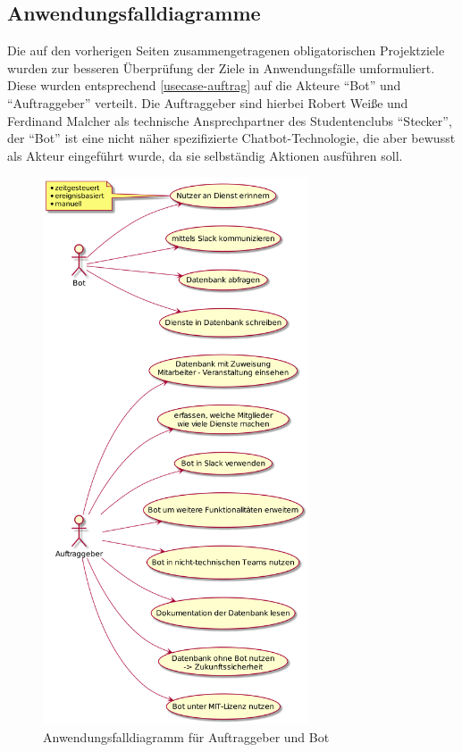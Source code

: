 \subsection{Anwendungsfalldiagramme}


Die auf den vorherigen Seiten zusammengetragenen obligatorischen Projektziele wurden zur besseren Überprüfung der Ziele in Anwendungsfälle umformuliert. Diese wurden entsprechend \autoref{usecase-auftrag} auf die Akteure \enquote{Bot} und \enquote{Auftraggeber} verteilt.
Die Auftraggeber sind hierbei Robert Weiße und Ferdinand Malcher als technische Ansprechpartner des Studentenclubs \enquote{Stecker}, der \enquote{Bot} ist eine nicht näher spezifizierte Chatbot-Technologie, die aber bewusst als Akteur eingeführt wurde, da sie selbständig Aktionen ausführen soll.



\begin{figure}[htbp]
    \includegraphics[width=0.7\textwidth]{../docs/uml/usecase-stakeholder.png}
    \caption{Anwendungsfalldiagramm für Auftraggeber und Bot}
    \label{usecase-auftrag}
\end{figure}


